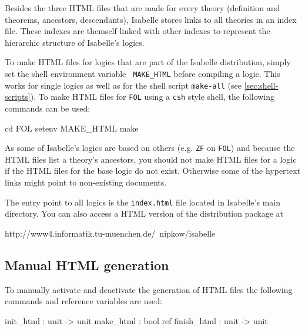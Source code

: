 Besides the three HTML files that are made for every theory
(definition and theorems, ancestors, descendants), Isabelle stores
links to all theories in an index file. These indexes are themself
linked with other indexes to represent the hierarchic structure of
Isabelle's logics.

To make HTML files for logics that are part of the Isabelle
distribution, simply set the shell environment variable {\tt
MAKE_HTML} before compiling a logic. This works for single logics as
well as for the shell script {\tt make-all} (see
\ref{sec:shell-scripts}). To make HTML files for {\tt FOL} using a
{\tt csh} style shell, the following commands can be used:

\begin{ttbox}
cd FOL
setenv MAKE_HTML
make
\end{ttbox}

As some of Isabelle's logics are based on others (e.g. {\tt ZF} on
{\tt FOL}) and because the HTML files list a theory's ancestors, you
should not make HTML files for a logic if the HTML files for the base
logic do not exist. Otherwise some of the hypertext links might point
to non-existing documents.

The entry point to all logics is the {\tt index.html} file located in
Isabelle's main directory. You can also access a HTML version of the
distribution package at

\begin{ttbox}
http://www4.informatik.tu-muenchen.de/~nipkow/isabelle
\end{ttbox}


\subsection*{Manual HTML generation}

To manually activate and deactivate the generation of HTML files the
following commands and reference variables are used:

\begin{ttbox}
init_html   : unit -> unit
make_html   : bool ref
finish_html : unit -> unit
\end{ttbox}

